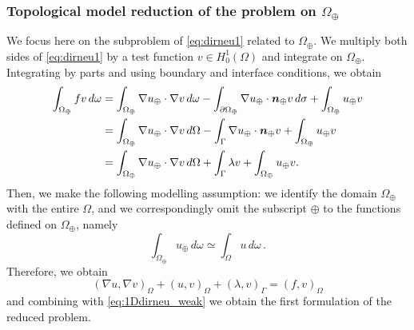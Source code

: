 \subsubsection*{Topological model reduction of the problem on $\Omega_{\oplus}$}
We focus here on the subproblem of \eqref{eq:dirneu1} related to $\Omega_{\oplus}$.
We multiply both sides of \eqref{eq:dirneu1} by a test function $v\in H^1_0(\Omega)$ and integrate on $\Omega_\oplus$. Integrating by parts and using boundary and interface conditions, we obtain
\begin{equation*}
\begin{split}
\int_{\Omega _{\oplus}}fv\,d\omega&=
\int _{\Omega _{\oplus}}\nabla u_{\oplus} \cdot\nabla v\,d\omega -\int _{\partial \Omega _{\oplus}}\nabla u_{\oplus} \cdot \boldsymbol n_{\oplus} v\,d\sigma + \int_{\Omega_{\oplus}} u_{\oplus} v
\\
&=\int _{\Omega _{\oplus}}\nabla u_{\oplus} \cdot\nabla v\,d\Omega -\int_{\Gamma} \nabla u_{\oplus} \cdot \boldsymbol n_{\oplus} v + \int_{\Omega_{\oplus}} u_{\oplus} v
\\
&=\int _{\Omega _{\oplus}}\nabla u_{\oplus} \cdot\nabla v\,d\Omega +\int_{\Gamma} \lambda v + \int_{\Omega_{\oplus}} u_{\oplus} v.
\end{split}
\end{equation*} 
Then, we make the following modelling assumption:
we identify the domain $\Omega_{\oplus}$ with the entire $\Omega$, 
and we correspondingly omit the subscript $\oplus$ to the functions defined on $\Omega_{\oplus}$,
namely
\begin{equation*}
\int_{\Omega_{\oplus}} u_\oplus\, d\omega \simeq \int_{\Omega} u\, d\omega\,.
\end{equation*}
Therefore, we obtain 
\begin{equation*}
(\nabla u ,\nabla v)_{\Omega} +(u,v)_{\Omega}+(\lambda, v)_{\Gamma}  =(f,v)_{\Omega}
\end{equation*}
and combining with \eqref{eq:1Ddirneu_weak} we obtain the first formulation of the reduced problem.

